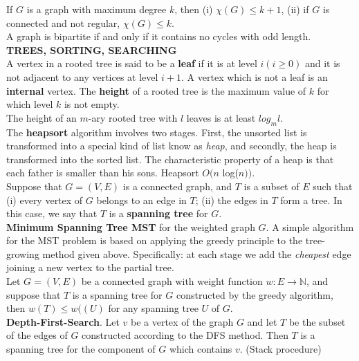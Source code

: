\documentclass[10pt,landscape]{article}
\begin{document}
\begin{multicols}{4}
If $G$ is a graph with maximum degree $k$, then (i) $\chi(G) \leq k +
1$, (ii) if $G$ is connected and not regular, $\chi(G) \leq k$.\\
A graph is bipartite if and only if it contains no cycles with odd length.\\
\textbf{TREES, SORTING, SEARCHING}\\

A vertex in a rooted tree is said to be a \textbf{leaf} if it is at
level $i (i \geq 0)$ and it is not adjacent to any vertices at level
$i + 1$. A vertex which is not a leaf is an \textbf{internal}
vertex. The \textbf{height} of a rooted tree is the maximum value of
$k$ for which level $k$ is not empty.\\

The height of an $m$-ary rooted tree with $l$ leaves is at least
$log_{m}l$.\\

The \textbf{heapsort} algorithm involves two stages. First, the
unsorted list is transformed into a special kind of list know as
\textit{heap}, and secondly, the heap is transformed into the sorted
list. The characteristic property of a heap is that each father is
smaller than his sons. Heapsort $O(n$ log($n))$.\\

Suppose that $G = (V, E)$ is a connected graph, and $T$ is a subset of
$E$ such that (i) every vertex of $G$ belongs to an edge in $T$; (ii)
the edges in $T$ form a tree. In this case, we say that $T$ is a
\textbf{spanning tree} for $G$.\\

\textbf{Minimum Spanning Tree MST} for the weighted graph $G$. A
simple algorithm for the MST problem is based on applying the greedy
principle to the tree-growing method given above. Specifically: at
each stage we add the \textit{cheapest} edge joining a new vertex to
the partial tree.\\

Let $G = (V,E)$ be a connected graph with weight function $w: E \to
\mathbb{N}$, and suppose that $T$ is a spanning tree for $G$
constructed by the greedy algorithm, then $w(T) \leq w((U)$ for any
spanning tree $U$ of $G$.\\

\textbf{Depth-First-Search}. Let $v$ be a vertex of the graph $G$ and
let $T$ be the subset of the edges of $G$ constructed according to the
DFS method. Then $T$ is a spanning tree for the component of $G$ which
contains $v$. (Stack procedure)\\


\end{multicols}
\end{document}
